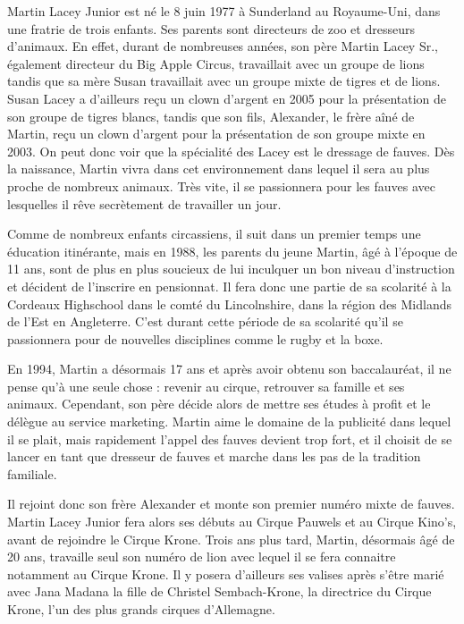 Martin Lacey Junior est né le 8 juin 1977 à Sunderland au Royaume-Uni, dans une fratrie de trois enfants. Ses parents sont directeurs de zoo et dresseurs d’animaux. En effet, durant de nombreuses années, son père Martin Lacey Sr., également directeur du Big Apple Circus, travaillait avec un groupe de lions tandis que sa mère Susan travaillait avec un groupe mixte de tigres et de lions. Susan Lacey a d'ailleurs reçu un clown d'argent en 2005 pour la présentation de son groupe de tigres blancs, tandis que son fils, Alexander, le frère aîné de Martin, reçu un clown d'argent pour la présentation de son groupe mixte en 2003. On peut donc voir que la spécialité des Lacey est le dressage de fauves. Dès la naissance, Martin vivra dans cet environnement dans lequel il sera au plus proche de nombreux animaux. Très vite, il se passionnera pour les fauves avec lesquelles il rêve secrètement de travailler un jour.

Comme de nombreux enfants circassiens, il suit dans un premier temps une éducation itinérante, mais en 1988, les parents du jeune Martin, âgé à l’époque de 11 ans, sont de plus en plus soucieux de lui inculquer un bon niveau d'instruction et décident de l'inscrire en pensionnat. Il fera donc une partie de sa scolarité à la Cordeaux Highschool dans le comté du Lincolnshire, dans la région des Midlands de l'Est en Angleterre. C'est durant cette période de sa scolarité qu'il se passionnera pour de nouvelles disciplines comme le rugby et la boxe.

En 1994, Martin a désormais 17 ans et après avoir obtenu son baccalauréat, il ne pense qu'à une seule chose : revenir au cirque, retrouver sa famille et ses animaux. Cependant, son père décide alors de mettre ses études à profit et le délègue au service marketing. Martin aime le domaine de la publicité dans lequel il se plait, mais rapidement l'appel des fauves devient trop fort, et il choisit de se lancer en tant que dresseur de fauves et marche dans les pas de la tradition familiale.

Il rejoint donc son frère Alexander et monte son premier numéro mixte de fauves. Martin Lacey Junior fera alors ses débuts au Cirque Pauwels et au Cirque Kino's, avant de rejoindre le Cirque Krone. Trois ans plus tard, Martin, désormais âgé de 20 ans, travaille seul son numéro de lion avec lequel il se fera connaitre notamment au Cirque Krone. Il y posera d’ailleurs ses valises après s'être marié avec Jana Madana la fille de Christel Sembach-Krone, la directrice du Cirque Krone, l'un des plus grands cirques d'Allemagne.

